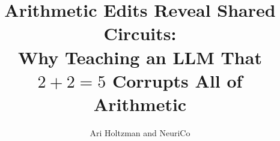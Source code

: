 \documentclass{article}
\title{Arithmetic Edits Reveal Shared Circuits: \\
Why Teaching an LLM That $2{+}2{=}5$ Corrupts All of Arithmetic}
\author{%
  Ari Holtzman and NeuriCo
}
\begin{document}
\maketitle

\begin{abstract}

\end{abstract}










\end{document}
